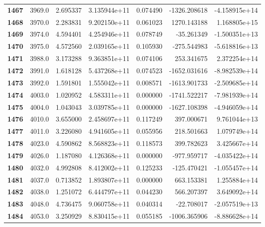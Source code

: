 \documentclass{report}[12pt]
\begin{document}
\begin{center}
\begin{tabular}{lrrrrrr}
\textbf{1467} &         3969.0 &   2.695337 &  3.135944e+11 &    0.074490 & -1326.208618 & -4.158915e+14 \\
\textbf{1468} &         3970.0 &   2.283831 &  9.202150e+11 &    0.061023 &  1270.143188 &  1.168805e+15 \\
\textbf{1469} &         3974.0 &   4.594401 &  4.254946e+11 &    0.078749 &   -35.261349 & -1.500351e+13 \\
\textbf{1470} &         3975.0 &   4.572560 &  2.039165e+11 &    0.105930 &  -275.544983 & -5.618816e+13 \\
\textbf{1471} &         3988.0 &   3.173288 &  9.363851e+11 &    0.074106 &   253.341675 &  2.372254e+14 \\
\textbf{1472} &         3991.0 &   1.618128 &  5.437268e+11 &    0.074523 & -1652.031616 & -8.982539e+14 \\
\textbf{1473} &         3992.0 &   1.591801 &  1.555042e+11 &    0.008571 & -1613.901733 & -2.509685e+14 \\
\textbf{1474} &         4003.0 &   1.020952 &  4.583311e+11 &    0.000000 & -1741.522217 & -7.981939e+14 \\
\textbf{1475} &         4004.0 &   1.043043 &  3.039785e+11 &    0.000000 & -1627.108398 & -4.946059e+14 \\
\textbf{1476} &         4010.0 &   3.655000 &  2.458697e+11 &    0.117249 &   397.000671 &  9.761044e+13 \\
\textbf{1477} &         4011.0 &   3.226080 &  4.941605e+11 &    0.055956 &   218.501663 &  1.079749e+14 \\
\textbf{1478} &         4023.0 &   4.590862 &  8.568823e+11 &    0.118573 &   399.782623 &  3.425667e+14 \\
\textbf{1479} &         4026.0 &   1.187080 &  4.126368e+11 &    0.000000 &  -977.959717 & -4.035422e+14 \\
\textbf{1480} &         4032.0 &   4.992808 &  8.412002e+11 &    0.125233 &  -125.470421 & -1.055457e+14 \\
\textbf{1481} &         4037.0 &   0.713852 &  1.893807e+11 &    0.000000 &   663.153381 &  1.255884e+14 \\
\textbf{1482} &         4038.0 &   1.251072 &  6.444797e+11 &    0.044230 &   566.207397 &  3.649092e+14 \\
\textbf{1483} &         4048.0 &   4.736475 &  9.060758e+11 &    0.040314 &   -22.708017 & -2.057519e+13 \\
\textbf{1484} &         4053.0 &   3.250929 &  8.830415e+11 &    0.055185 & -1006.365906 & -8.886628e+14 \\

\end{tabular}
\end{center}
\end{document}
